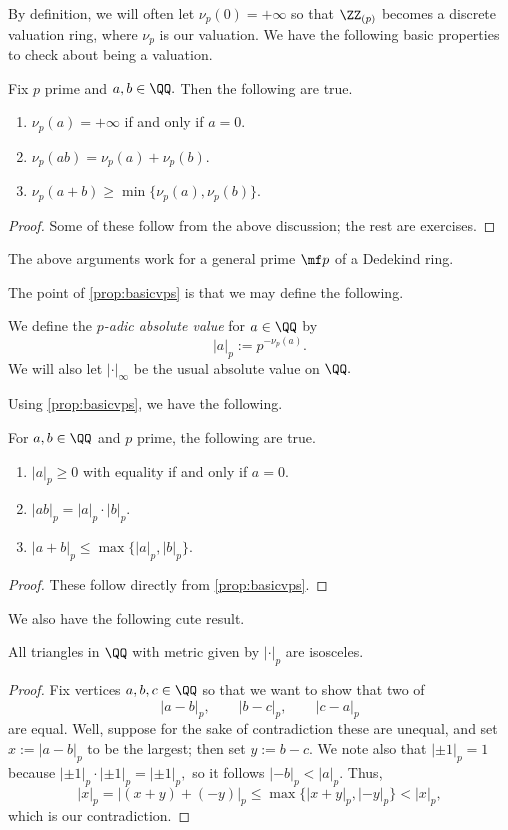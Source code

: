 By definition, we will often let $\nu_p(0)=+\infty$ so that $\ZZ_{(p)}$ becomes a discrete valuation ring, where $\nu_p$ is our valuation. We have the following basic properties to check about being a valuation.
\begin{proposition} \label{prop:basicvps}
	Fix $p$ prime and $a,b\in\QQ.$ Then the following are true.
	\begin{enumerate}[label=(\alph*)]
		\item $\nu_p(a)=+\infty$ if and only if $a=0.$
		\item $\nu_p(ab)=\nu_p(a)+\nu_p(b).$
		\item $\nu_p(a+b)\ge\min\{\nu_p(a),\nu_p(b)\}.$
	\end{enumerate}
\end{proposition}
\begin{proof}
	Some of these follow from the above discussion; the rest are exercises.\todo{}
\end{proof}
\begin{remark}
	The above arguments work for a general prime $\mf p$ of a Dedekind ring.
\end{remark}
The point of \autoref{prop:basicvps} is that we may define the following.
\begin{defi}
	We define the \textit{$p$-adic absolute value} for $a\in\QQ$ by
	\[|a|_p:=p^{-\nu_p(a)}.\]
	We will also let $|\cdot|_\infty$ be the usual absolute value on $\QQ.$
\end{defi}
Using \autoref{prop:basicvps}, we have the following.
\begin{corollary}
	For $a,b\in\QQ$ and $p$ prime, the following are true.
	\begin{enumerate}[label=(\alph*)]
		\item $|a|_p\ge0$ with equality if and only if $a=0.$
		\item $|ab|_p=|a|_p\cdot|b|_p.$
		\item $|a+b|_p\le\max\{|a|_p,|b|_p\}.$
	\end{enumerate}
\end{corollary}
\begin{proof}
	These follow directly from \autoref{prop:basicvps}.
\end{proof}
We also have the following cute result.
\begin{proposition}
	All triangles in $\QQ$ with metric given by $|\cdot|_p$ are isosceles.
\end{proposition}
\begin{proof}
	Fix vertices $a,b,c\in\QQ$ so that we want to show that two of
	\[|a-b|_p,\qquad|b-c|_p,\qquad|c-a|_p\]
	are equal. Well, suppose for the sake of contradiction these are unequal, and set $x:=|a-b|_p$ to be the largest; then set $y:=b-c.$ We note also that $|\pm1|_p=1$ because $|\pm1|_p\cdot|\pm1|_p=|\pm1|_p,$ so it follows $|-b|_p<|a|_p.$ Thus,
	\[|x|_p=|(x+y)+(-y)|_p\le\max\{|x+y|_p,|-y|_p\}<|x|_p,\]
	which is our contradiction.
\end{proof}
